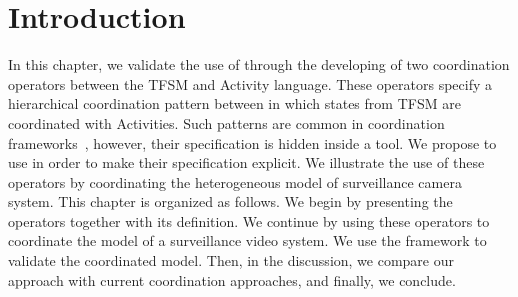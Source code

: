 \section{Introduction}
In this chapter, we validate the use of \bcool through the developing of two coordination operators between the TFSM and Activity language. These operators specify a hierarchical coordination pattern between in which states from TFSM are coordinated with Activities. Such patterns are common in coordination frameworks~\cite{giraultbib}, however, their specification is hidden inside a tool. We propose to use \bcool in order to make their specification explicit. We illustrate the use of these operators by coordinating the heterogeneous model of surveillance camera system. This chapter is organized as follows. We begin by presenting the operators together with its \bcool definition. We continue by using these operators to coordinate the model of a surveillance video system. We use the \bcool framework to validate the coordinated model. Then, in the discussion, we compare our approach with current coordination approaches, and finally, we conclude.  